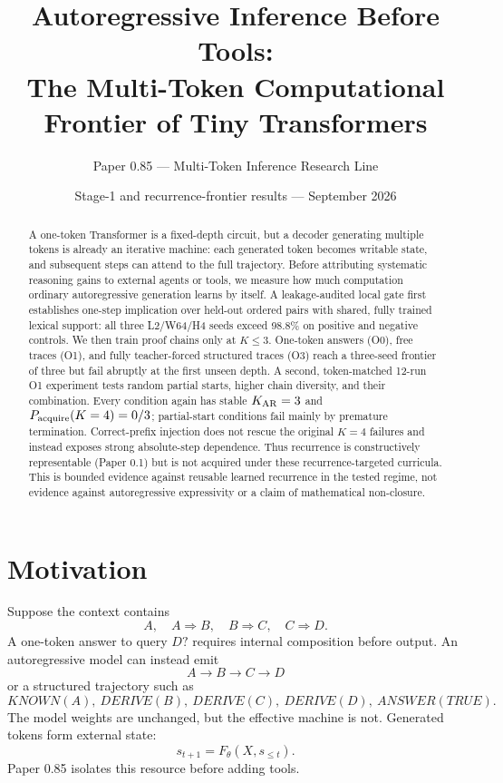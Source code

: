 \documentclass[10pt]{article}
\title{Autoregressive Inference Before Tools:\\The Multi-Token Computational Frontier of Tiny Transformers}
\author{Paper 0.85 --- Multi-Token Inference Research Line}
\date{Stage-1 and recurrence-frontier results --- September 2026}
\begin{document}
\maketitle
\begin{abstract}
A one-token Transformer is a fixed-depth circuit, but a decoder generating multiple tokens is already an iterative machine: each generated token becomes writable state, and subsequent steps can attend to the full trajectory. Before attributing systematic reasoning gains to external agents or tools, we measure how much computation ordinary autoregressive generation learns by itself. A leakage-audited local gate first establishes one-step implication over held-out ordered pairs with shared, fully trained lexical support: all three L2/W64/H4 seeds exceed 98.8\% on positive and negative controls. We then train proof chains only at $K\le3$. One-token answers (O0), free traces (O1), and fully teacher-forced structured traces (O3) reach a three-seed frontier of three but fail abruptly at the first unseen depth. A second, token-matched 12-run O1 experiment tests random partial starts, higher chain diversity, and their combination. Every condition again has stable $K_{\rm AR}=3$ and $P_{\rm acquire}(K=4)=0/3$; partial-start conditions fail mainly by premature termination. Correct-prefix injection does not rescue the original $K=4$ failures and instead exposes strong absolute-step dependence. Thus recurrence is constructively representable (Paper 0.1) but is not acquired under these recurrence-targeted curricula. This is bounded evidence against reusable learned recurrence in the tested regime, not evidence against autoregressive expressivity or a claim of mathematical non-closure.
\end{abstract}

\section{Motivation}
Suppose the context contains
\[
A,\quad A\Rightarrow B,\quad B\Rightarrow C,\quad C\Rightarrow D.
\]
A one-token answer to query $D?$ requires internal composition before output. An autoregressive model can instead emit
\[
A\rightarrow B\rightarrow C\rightarrow D
\]
or a structured trajectory such as
\[
KNOWN(A),\ DERIVE(B),\ DERIVE(C),\ DERIVE(D),\ ANSWER(TRUE).
\]
The model weights are unchanged, but the effective machine is not. Generated tokens form external state:
\[
s_{t+1}=F_\theta(X,s_{\le t}).
\]
Paper 0.85 isolates this resource before adding tools.
\end{document}
